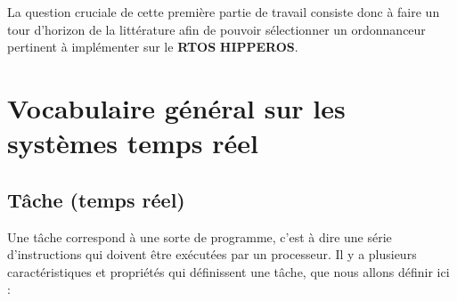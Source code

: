 \documentclass[11pt,a4paper,oneside]{report}
\begin{document}
	La question cruciale de cette première partie de travail 
	consiste donc à faire un tour d'horizon de la littérature afin de pouvoir 
	sélectionner un ordonnanceur pertinent à implémenter sur le \textbf{RTOS} \textbf{HIPPEROS}.
	
	\section{Vocabulaire général sur les systèmes temps réel}
	
	\subsection{Tâche (temps réel)}
	Une tâche correspond à une sorte de programme, c'est à dire une série d'instructions 
	qui doivent être exécutées par un processeur. 
	Il y a plusieurs caractéristiques 
	et propriétés qui définissent une tâche, que nous allons définir ici : 
\end{document}
